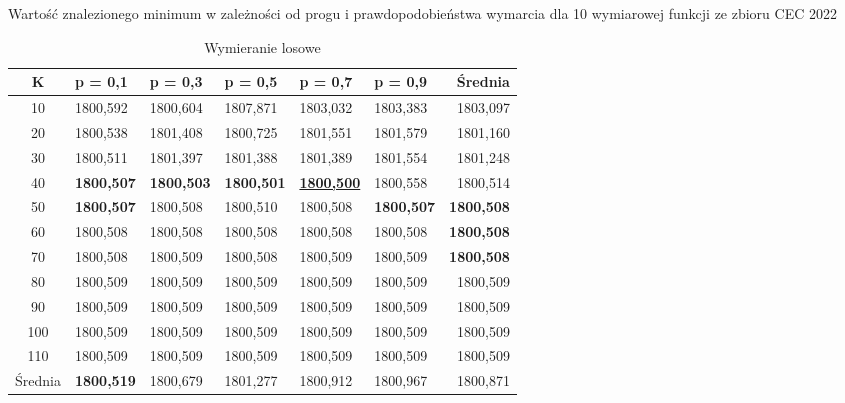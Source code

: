 \documentclass[10pt]{article}
\begin{document}
\begin{table}[H]
\caption{Wartość znalezionego minimum w zależności od progu i prawdopodobieństwa wymarcia dla 10 wymiarowej funkcji ze zbioru CEC 2022}
\label{tab:test-extinction-cec10}
\begin{subtable}{\textwidth}
\centering
\begin{tabularx}{0.8\textwidth}{c||X|X|X|X|X||r}
\hline
K & p = 0,1 & p = 0,3 & p = 0,5 & p = 0,7 & p = 0,9 & Średnia  \\ 
\hline \hline
10 & 1800,592 & 1800,604 & 1807,871 & 1803,032 & 1803,383 & 1803,097  \\ 
20 & 1800,538 & 1801,408 & 1800,725 & 1801,551 & 1801,579 & 1801,160  \\ 
30 & 1800,511 & 1801,397 & 1801,388 & 1801,389 & 1801,554 & 1801,248  \\ 
40 & \textbf{1800,507} & \textbf{1800,503} & \textbf{1800,501} & \underline{\textbf{1800,500}} & 1800,558 & 1800,514  \\ 
50 & \textbf{1800,507} & 1800,508 & 1800,510 & 1800,508 & \textbf{1800,507} & \textbf{1800,508}  \\ 
60 & 1800,508 & 1800,508 & 1800,508 & 1800,508 & 1800,508 & \textbf{1800,508}  \\ 
70 & 1800,508 & 1800,509 & 1800,508 & 1800,509 & 1800,509 & \textbf{1800,508}  \\ 
80 & 1800,509 & 1800,509 & 1800,509 & 1800,509 & 1800,509 & 1800,509  \\ 
90 & 1800,509 & 1800,509 & 1800,509 & 1800,509 & 1800,509 & 1800,509  \\ 
100 & 1800,509 & 1800,509 & 1800,509 & 1800,509 & 1800,509 & 1800,509  \\ 
110 & 1800,509 & 1800,509 & 1800,509 & 1800,509 & 1800,509 & 1800,509  \\ 
\hline
Średnia & \textbf{1800,519} & 1800,679 & 1801,277 & 1800,912 & 1800,967 & 1800,871  \\ 
\hline
\end{tabularx}
\caption{Wymieranie losowe}
\end{subtable}


\end{table}
\end{document}

